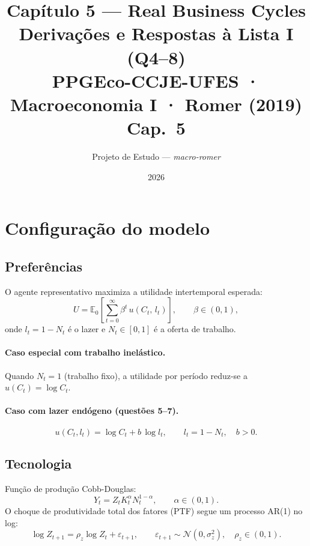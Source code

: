 \documentclass[11pt,a4paper]{article}
\title{\textbf{Capítulo 5 --- Real Business Cycles}\\[4pt]
       {\large Derivações e Respostas à Lista I (Q4--8)}\\[2pt]
       {\normalsize PPGEco-CCJE-UFES · Macroeconomia I · Romer (2019) Cap.\ 5}}
\author{Projeto de Estudo --- \textit{macro-romer}}
\date{2026}
\newcommand{\E}{\mathbb{E}}
\begin{document}
\maketitle
\tableofcontents
\bigskip

\section{Configuração do modelo}

\subsection{Preferências}

O agente representativo maximiza a utilidade intertemporal esperada:
\begin{equation}\label{eq:utility}
  U = \E_0\!\left[\sum_{t=0}^{\infty} \beta^t\, u(C_t,\, l_t)\right],
  \qquad \beta\in(0,1),
\end{equation}
onde $l_t = 1 - N_t$ é o lazer e $N_t \in[0,1]$ é a oferta de trabalho.

\paragraph{Caso especial com trabalho inelástico.}
Quando $N_t = 1$ (trabalho fixo), a utilidade por período reduz-se a
$u(C_t) = \log C_t$.

\paragraph{Caso com lazer endógeno (questões 5--7).}
\begin{equation}\label{eq:utility_leisure}
  u(C_t, l_t) = \log C_t + b\,\log l_t, \qquad l_t = 1 - N_t,\quad b>0.
\end{equation}

\subsection{Tecnologia}

Função de produção Cobb-Douglas:
\begin{equation}
  Y_t = Z_t K_t^{\alpha} N_t^{1-\alpha},\qquad \alpha\in(0,1).
\end{equation}
O choque de produtividade total dos fatores (PTF) segue um processo AR(1) no log:
\begin{equation}\label{eq:ar1}
  \log Z_{t+1} = \rho_z \log Z_t + \varepsilon_{t+1},\qquad
  \varepsilon_{t+1} \sim \mathcal{N}(0,\sigma_z^2),\quad \rho_z\in(0,1).
\end{equation}
\end{document}

